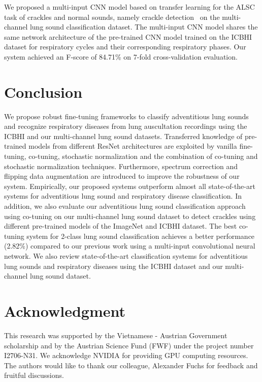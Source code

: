 \documentclass[journal]{IEEEtran}
\begin{document}
We proposed a multi-input CNN model based on transfer learning for the ALSC task of crackles and normal sounds, namely crackle detection~\cite{nguyen2021crackle}  on the multi-channel lung sound classification dataset. The multi-input CNN model shares the same network architecture of the pre-trained CNN model trained on the ICBHI dataset for respiratory cycles and their corresponding respiratory phases. Our system achieved an F-score of 84.71\% on 7-fold cross-validation evaluation.

\section{Conclusion}
We propose robust fine-tuning frameworks to classify adventitious lung sounds and recognize respiratory diseases from lung auscultation recordings using the ICBHI and our multi-channel lung sound datasets. Transferred knowledge of pre-trained models from different ResNet architectures are exploited by vanilla fine-tuning, co-tuning, stochastic normalization and the combination of co-tuning and stochastic normalization techniques. Furthermore, spectrum correction and flipping data augmentation are introduced to improve the robustness of our system. Empirically, our proposed systems outperform almost all state-of-the-art systems for adventitious lung sound and respiratory disease classification. In addition, we also evaluate our adventitious lung sound classification approach using co-tuning on our multi-channel lung sound dataset to detect crackles using different pre-trained models of the ImageNet and ICBHI dataset. The best co-tuning system for 2-class lung sound classification achieves a better performance (2.82\%) compared to our previous work using a multi-input convolutional neural network. We also review state-of-the-art classification systems for adventitious lung sounds and respiratory diseases using the ICBHI dataset and our multi-channel lung sound dataset.












\section*{Acknowledgment}
This research was supported by the Vietnamese - Austrian Government scholarship and by the Austrian Science Fund (FWF) under the 
project number I2706-N31. We acknowledge NVIDIA for providing GPU computing resources. The authors would like to thank our colleague, Alexander Fuchs for feedback and fruitful discussions. 
\end{document}
